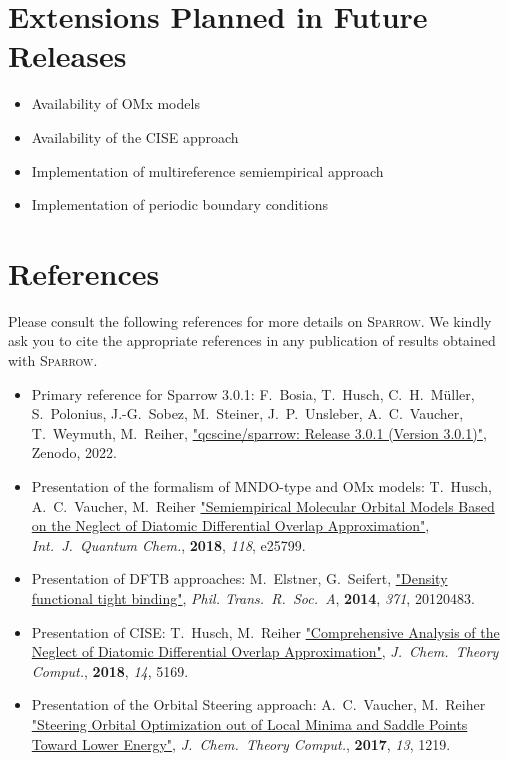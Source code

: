 \documentclass[]{tufte-book}
\begin{document}
\chapter{Extensions Planned in Future Releases}
\begin{itemize}
\item Availability of OMx models
\item Availability of the CISE approach
\item Implementation of multireference semiempirical approach
\item Implementation of periodic boundary conditions
\end{itemize}



\chapter{References}

Please consult the following references for more details on \textsc{Sparrow}.
We kindly ask you to cite the appropriate references in any publication of results obtained with \textsc{Sparrow}.
\vspace{1.0cm}

\begin{itemize}
\item Primary reference for Sparrow 3.0.1:
F.~Bosia, T.~Husch, C.~H.~M\"uller, S.~Polonius, J.-G.~Sobez, M.~Steiner, J.~P.~Unsleber, A.~C.~Vaucher, T.~Weymuth, M.~Reiher, \href{https://doi.org/10.5281/zenodo.3244105}{"qcscine/sparrow: Release 3.0.1 (Version 3.0.1)"}, Zenodo, 2022.
\item Presentation of the formalism of MNDO-type and OMx models: \newline
T.~Husch, A.~C.~Vaucher, M.~Reiher \href{https://doi.org/10.1002/qua.25799}{"Semiempirical Molecular Orbital Models Based on the Neglect of Diatomic Differential Overlap Approximation"}, \textit{Int.~J.~Quantum Chem.}, \textbf{2018}, \textit{118}, e25799.
\item Presentation of DFTB approaches: \newline
M.~Elstner, G.~Seifert, \href{https://doi.org/10.1098/rsta.2012.0483}{"Density functional tight binding"}, \textit{Phil. Trans.~R.~Soc.~A}, \textbf{2014}, \textit{371}, 20120483.
\item Presentation of CISE: \newline
T.~Husch, M.~Reiher \href{https://doi.org/10.1021/acs.jctc.8b00601}{"Comprehensive Analysis of the Neglect of Diatomic Differential Overlap Approximation"}, \textit{J.~Chem.~Theory Comput.}, \textbf{2018}, \textit{14}, 5169.
\item Presentation of the Orbital Steering approach: \newline
A.~C.~Vaucher, M.~Reiher
    \href{https://doi.org/10.1021/acs.jctc.7b00011}{"Steering Orbital
    Optimization out of Local Minima and Saddle Points Toward Lower Energy"},
    \textit{J.~Chem.~Theory Comput.}, \textbf{2017}, \textit{13}, 1219.
\end{itemize}





\end{document}

